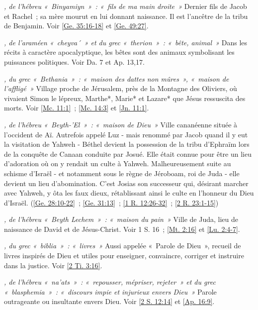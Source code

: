 \begin{multicols}{2}
\textit{, de l'hébreu «~Binyamiyn~»~: «~fils de ma main droite~»}\newline
Dernier fils de Jacob et Rachel~; sa mère mourut en lui donnant naissance. Il est l'ancêtre de la tribu de Benjamin. Voir \vref{Ge. 35:16-18} et \vref{Ge. 49:27}.

\textit{, de l'araméen «~cheyva´~» et du grec «~therion~»~: «~bête, animal~»}\newline
Dans les récits à caractère apocalyptique, les bêtes sont des animaux symbolisant les puissances politiques. Voir Da. 7 et Ap. 13,17.

\textit{, du grec «~Bethania~»~: «~maison des dattes non mûres~», «~maison de l'affligé~»}\newline
Village proche de Jérusalem, près de la Montagne des Oliviers, où vivaient Simon le lépreux, Marthe*, Marie* et Lazare* que Jésus ressuscita des morts. Voir \vref{Mc. 11:1}~; \vref{Mc. 14:3} et \vref{Jn. 11:1}.

\textit{, de l'hébreu «~Beyth-'El~»~: «~maison de Dieu~»}\newline
Ville cananéenne située à l'occident de Aï. Autrefois appelé Luz - mais renommé par Jacob quand il y eut la visitation de Yahweh - Béthel devient la possession de la tribu d'Ephraïm lors de la conquête de Canaan conduite par Josué. Elle était connue pour être un lieu d'adoration où on y rendait un culte à Yahweh. Malheureusement suite au schisme d'Israël - et notamment sous le règne de Jéroboam, roi de Juda - elle devient un lieu d'abomination. C'est Josias son successeur qui, désirant marcher avec Yahweh, y ôta les faux dieux, rétablissant ainsi le culte en l'honneur du Dieu d'Israël. (\vref{Ge. 28:10-22}~; \vref{Ge. 31:13}~; \vref{1 R. 12:26-32}~; \vref{2 R. 23:1-15})

\textit{, de l'hébreu «~Beyth Lechem~»~: «~maison du pain~»}\newline
Ville de Juda, lieu de naissance de David et de Jésus-Christ. Voir 1 S. 16~; \vref{Mt. 2:16} et \vref{Lu. 2:4-7}.

\textit{, du grec «~biblia~»~: «~livres~»}\newline
Aussi appelée «~Parole de Dieu~», recueil de livres inspirés de Dieu et utiles pour enseigner, convaincre, corriger et instruire dans la justice. Voir \vref{2 Ti. 3:16}.

\textit{, de l'hébreu «~na'ats~»~: «~repousser, mépriser, rejeter~» et du grec «~blasphemia~»~: «~discours impie et injurieux envers Dieu~»}\newline
Parole outrageante ou insultante envers Dieu. Voir \vref{2 S. 12:14} et \vref{Ap. 16:9}.


\end{multicols}
